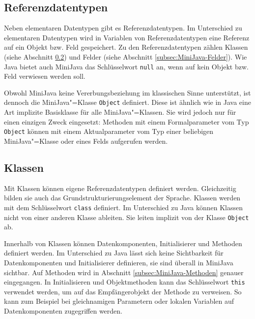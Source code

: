 \pagebreak


\subsection{Referenzdatentypen}

Neben elementaren Datentypen gibt es Referenzdatentypen. Im Unterschied zu elementaren Datentypen wird in Variablen von Referenzdatentypen eine Referenz auf ein Objekt bzw. Feld gespeichert. Zu den Referenzdatentypen zählen Klassen (siehe Abschnitt \ref{subsec:MiniJava-Klassen}) und Felder (siehe Abschnitt \ref{subsec:MiniJava-Felder}). Wie Java bietet auch MiniJava das Schlüsselwort \lstinline{null} an, wenn auf kein Objekt bzw. Feld verwiesen werden soll.

Obwohl MiniJava keine Vererbungsbeziehung im klassischen Sinne unterstützt, ist dennoch die MiniJava"=Klasse \lstinline{Object} definiert. Diese ist ähnlich wie in Java eine Art implizite Basisklasse für alle MiniJava"=Klassen. Sie wird jedoch nur für einen einzigen Zweck eingesetzt: Methoden mit einem Formalparameter vom Typ \lstinline{Object} können mit einem Aktualparameter vom Typ einer beliebigen MiniJava"=Klasse oder eines Felds aufgerufen werden.

\subsection{Klassen}
\label{subsec:MiniJava-Klassen}

Mit Klassen können eigene Referenzdatentypen definiert werden. Gleichzeitig bilden sie auch das Grundstrukturierungselement der Sprache. Klassen werden mit dem Schlüsselwort \lstinline{class} definiert. Im Unterschied zu Java können Klassen nicht von einer anderen Klasse ableiten. Sie leiten implizit von der Klasse \lstinline{Object} ab.

Innerhalb von Klassen können Datenkomponenten, Initialisierer und Methoden definiert werden. Im Unterschied zu Java lässt sich keine Sichtbarkeit für Datenkomponenten und Initialisierer definieren, sie sind überall in MiniJava sichtbar. Auf Methoden wird in Abschnitt \ref{subsec:MiniJava-Methoden} genauer eingegangen. In Initialisieren und Objektmethoden kann das Schlüsselwort \lstinline{this} verwendet werden, um auf das Empfängerobjekt der Methode zu verweisen. So kann zum Beispiel bei gleichnamigen Parametern oder lokalen Variablen auf Datenkomponenten zugegriffen werden.

